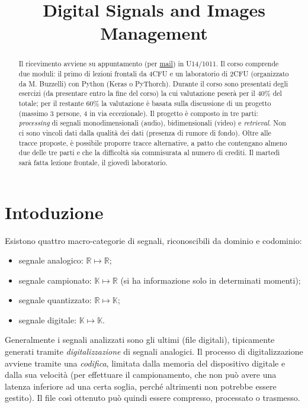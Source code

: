 \documentclass[11pt, a4page]{article}
\title{\textbf{Digital Signals and Images Management}}
\author{}
\date{}
\begin{document}
\maketitle
\begin{abstract}
  Il ricevimento avviene su appuntamento (per \href{mailto://simone.bianco@unimib.it}{mail}) in U14/1011.
  Il corso comprende due moduli: il primo di lezioni frontali da 4CFU e un laboratorio di 2CFU (organizzato da M. Buzzelli) con Python (Keras o PyThorch).
  Durante il corso sono presentati degli esercizi (da presentare entro la fine del corso) la cui valutazione peserà per il $40\%$ del totale; per il restante $60\%$ la valutazione è basata sulla discussione di un progetto (massimo 3 persone, 4 in via eccezionale).
  Il progetto è composto in tre parti: \textit{processing} di segnali monodimensionali (audio), bidimensionali (video) e \textit{retrieval}.
  Non ci sono vincoli dati dalla qualità dei dati (presenza di rumore di fondo).
  Oltre alle tracce proposte, è possibile proporre tracce alternative, a patto che contengano almeno due delle tre parti e che la difficoltà sia commisurata al numero di crediti.
  Il martedì sarà fatta lezione frontale, il giovedì laboratorio.
\end{abstract}
\tableofcontents
\newpage

\part{Intoduzione}
Esistono quattro macro-categorie di segnali, riconoscibili da dominio e codominio:
\begin{itemize}[noitemsep]
\item segnale analogico: $\mathbb{R} \mapsto \mathbb{R}$;
\item segnale campionato: $\mathbb{K} \mapsto \mathbb{R}$ (si ha informazione solo in determinati momenti);
\item segnale quantizzato: $\mathbb{R} \mapsto \mathbb{K}$;
\item segnale digitale: $\mathbb{K} \mapsto \mathbb{K}$.
\end{itemize}
Generalmente i segnali analizzati sono gli ultimi (file digitali), tipicamente generati tramite \textit{digitalizzazione} di segnali analogici.
Il processo di digitalizzazione avviene tramite una \textit{codifica}, limitata dalla memoria del dispositivo digitale e dalla sua velocità (per effettuare il campionamento, che non può avere una latenza inferiore ad una certa soglia, perché altrimenti non potrebbe essere gestito).
Il file così ottenuto può quindi essere compresso, processato o trasmesso.
\end{document}

